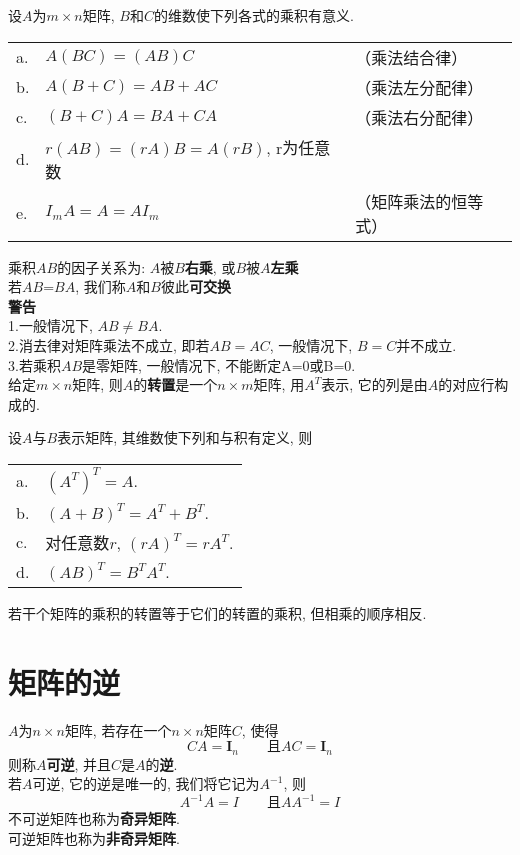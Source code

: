 \begin{TheoremOne}
设$A$为$m\times n$矩阵, $B$和$C$的维数使下列各式的乘积有意义.\\
\begin{tabular}{l@{\ }l l}
a. & $A(BC)=(AB)C$ & （乘法结合律）\\
b. & $A(B+C)=AB+AC$ & （乘法左分配律）\\
c. & $(B+C)A=BA+CA$ & （乘法右分配律）\\
d. & $r(AB)=(rA)B=A(rB)$, r为任意数 &\\
e. & $I_mA=A=AI_m$ & （矩阵乘法的恒等式）
\end{tabular}
\end{TheoremOne}\vspace{4ex}

乘积$AB$的因子关系为: $A$被$B$\textbf{右乘}, 或$B$被$A$\textbf{左乘}\\
若$AB$=$BA$, 我们称$A$和$B$彼此\textbf{可交换}\\[2ex]

\textbf{警告}\\
1.一般情况下, $AB\neq BA$.\\
2.消去律对矩阵乘法不成立, 即若$AB=AC$, 一般情况下, $B=C$并不成立.\\
3.若乘积$AB$是零矩阵, 一般情况下, 不能断定A=0或B=0.\\[2ex]

给定$m\times n$矩阵, 则$A$的\textbf{转置}是一个$n\times m$矩阵, 用$A^T$表示, 它的列是由$A$的对应行构成的.\\[2ex]

\begin{TheoremOne}
设$A$与$B$表示矩阵, 其维数使下列和与积有定义, 则\\
\begin{tabular}{l@{\ }l}
a. & $(A^T)^T=A$.\\
b. & $(A+B)^T=A^T+B^T$.\\
c. & 对任意数$r$, $(rA)^T=rA^T$.\\
d. & $(AB)^T=B^TA^T$.
\end{tabular}
\end{TheoremOne}\vspace{4ex}

\begin{law}
若干个矩阵的乘积的转置等于它们的转置的乘积, 但相乘的顺序相反.
\end{law}\vspace{8ex}

\section{矩阵的逆}
$A$为$n\times n$矩阵, 若存在一个$n\times n$矩阵$C$, 使得
\[CA=\bm{I}_n\qquad\text{且}AC=\bm{I}_n\]
则称$A$\textbf{可逆}, 并且$C$是$A$的\textbf{逆}.\\[2ex]
若$A$可逆, 它的逆是唯一的, 我们将它记为$A^{-1}$, 则
\[A^{-1}A=I\qquad\text{且}AA^{-1}=I\]
不可逆矩阵也称为\textbf{奇异矩阵}.\\
可逆矩阵也称为\textbf{非奇异矩阵}.\\[2ex]

